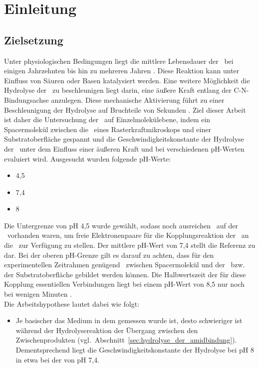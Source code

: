 \chapter{Einleitung}
\label{kap:einleitung}

\section{Zielsetzung}
\label{sec:zielsetzung}

Unter physiologischen Bedingungen liegt die mittlere Lebensdauer der \amid~bei einigen Jahrzehnten bis hin zu mehreren Jahren \cites{Radzicka.}[41]{Berg.2018}. Diese Reaktion kann unter Einfluss von Säuren oder Basen katalysiert werden. Eine weitere Möglichkeit die Hydrolyse der \amid~zu beschleunigen liegt darin, eine äußere Kraft entlang der C-N-Bindungsachse anzulegen. Diese mechanische Aktivierung führt zu einer Beschleunigung der Hydrolyse auf Bruchteile von Sekunden \cites{ClausenSchaumann.2018}. Ziel dieser Arbeit ist daher die Untersuchung der \amid~auf Einzelmolekülebene, indem ein Spacermolekül zwischen die \spitze~eines Rasterkraftmikroskops und einer Substratoberfläche gespannt und die Geschwindigkeitskonstante der Hydrolyse der \amid~unter dem Einfluss einer äußeren Kraft und bei verschiedenen pH-Werten evaluiert wird. Ausgesucht wurden folgende pH-Werte:

\begin{itemize}
	\item 4,5
	\item 7,4
	\item 8
\end{itemize}

Die Untergrenze von pH 4,5 wurde gewählt, sodass noch ausreichen \aminos~auf der \spitze~vorhanden waren, um freie Elektronenpaare für die Kopplungsreaktion der \carboxys~an die \aminos~zur Verfügung zu stellen. Der mittlere pH-Wert von 7,4 stellt die Referenz zu \cites{ClausenSchaumann.2018} dar. Bei der oberen pH-Grenze gilt es darauf zu achten, dass für den experimentellen Zeitrahmen genügend \amid~zwischen Spacermolekül und der \spitze~bzw. der Substratoberfläche gebildet werden können. Die Halbwertszeit der für diese Kopplung essentiellen Verbindungen liegt bei einem pH-Wert von 8,5 nur noch bei wenigen Minuten \cites{Hayworth}.\\
Die Arbeitshypothese lautet dabei wie folgt:

\begin{itemize}
	\item Je basischer das Medium in dem gemessen wurde ist, desto schwieriger ist während der Hydrolysereaktion der Übergang zwischen den Zwischenprodukten (vgl.~Abschnitt~\ref{sec:hydrolyse_der_amidbindung}). Dementsprechend liegt die Geschwindigkeitskonstante der Hydrolyse bei pH 8 in etwa bei der von pH 7,4.
\end{itemize}

